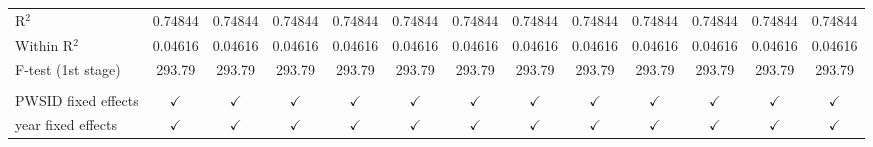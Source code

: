 \begin{table}[htbp]
\begin{adjustbox}{width = \textwidth, center}
\begin{tabular}{lcccccccccccc}
         R$^2$                                   & 0.74844         & 0.74844         & 0.74844                     & 0.74844             & 0.74844              & 0.74844             & 0.74844                           & 0.74844                   & 0.74844             & 0.74844            & 0.74844                          & 0.74844\\  
         Within R$^2$                            & 0.04616         & 0.04616         & 0.04616                     & 0.04616             & 0.04616              & 0.04616             & 0.04616                           & 0.04616                   & 0.04616             & 0.04616            & 0.04616                          & 0.04616\\  
         F-test (1st stage)                      & 293.79          & 293.79          & 293.79                      & 293.79              & 293.79               & 293.79              & 293.79                            & 293.79                    & 293.79              & 293.79             & 293.79                           & 293.79\\  
          \\
         PWSID fixed effects                     & $\checkmark$    & $\checkmark$    & $\checkmark$                & $\checkmark$        & $\checkmark$         & $\checkmark$        & $\checkmark$                      & $\checkmark$              & $\checkmark$        & $\checkmark$       & $\checkmark$                     & $\checkmark$\\   
         year fixed effects                      & $\checkmark$    & $\checkmark$    & $\checkmark$                & $\checkmark$        & $\checkmark$         & $\checkmark$        & $\checkmark$                      & $\checkmark$              & $\checkmark$        & $\checkmark$       & $\checkmark$                     & $\checkmark$\\   
         \bottomrule
      \end{tabular}
   \end{adjustbox}
\end{table}


